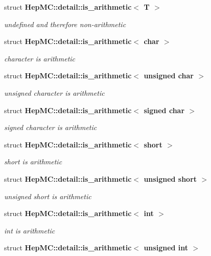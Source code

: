 \begin{CompactItemize}
\item 
struct {\bf Hep\-MC::detail::is\_\-arithmetic$<$ T $>$}
\begin{CompactList}\small\item\em undefined and therefore non-arithmetic \item\end{CompactList}\item 
struct {\bf Hep\-MC::detail::is\_\-arithmetic$<$ char $>$}
\begin{CompactList}\small\item\em character is arithmetic \item\end{CompactList}\item 
struct {\bf Hep\-MC::detail::is\_\-arithmetic$<$ unsigned char $>$}
\begin{CompactList}\small\item\em unsigned character is arithmetic \item\end{CompactList}\item 
struct {\bf Hep\-MC::detail::is\_\-arithmetic$<$ signed char $>$}
\begin{CompactList}\small\item\em signed character is arithmetic \item\end{CompactList}\item 
struct {\bf Hep\-MC::detail::is\_\-arithmetic$<$ short $>$}
\begin{CompactList}\small\item\em short is arithmetic \item\end{CompactList}\item 
struct {\bf Hep\-MC::detail::is\_\-arithmetic$<$ unsigned short $>$}
\begin{CompactList}\small\item\em unsigned short is arithmetic \item\end{CompactList}\item 
struct {\bf Hep\-MC::detail::is\_\-arithmetic$<$ int $>$}
\begin{CompactList}\small\item\em int is arithmetic \item\end{CompactList}\item 
struct {\bf Hep\-MC::detail::is\_\-arithmetic$<$ unsigned int $>$}

\end{CompactItemize}
